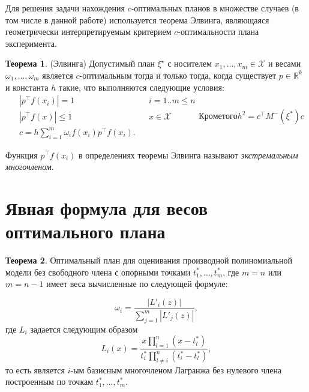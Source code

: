 \documentclass[specialist,
               substylefile = spbu.rtx,
               subf,href,colorlinks=true, 12pt]{disser}
\theoremstyle{definition}
\newtheorem{theorem}{Теорема}
\newcommand\abs[1]{\left\lvert#1\right\rvert}
\begin{document}
  Для решения задачи нахождения $c$-оптимальных планов в множестве случаев (в том числе в данной работе) используется теорема Элвинга, являющаяся геометрически интерпретируемым критерием $c$-оптимальности плана эксперимента.
  \begin{theorem}
  \label{th:elfving}
  (Элвинга) \cite{elfving1952}
  Допустимый план $\xi^\star$ с носителем $x_1, \ldots, x_m \in \mathcal{X}$ и весами $\omega_1, \ldots, \omega_m$ является $c$-оптимальным тогда и только тогда, когда существует $p \in \mathbb{R}^k$ и константа $h$ такие, что выполняются следующие условия:
  \begin{subequations}
  \label{eq:elfving}
  \begin{align}
	&\abs{p^\top f(x_i)} = 1 &&i=1..m \leqslant n \label{eq:elfving:eq1} \\
	&\abs{p^\top f(x)} \leqslant 1  &&x \in \mathcal{X} \label{eq:elfving:eq2} \\
	&c = h \sum_{i=1}^m \omega_i f(x_i) p^\top f(x_i) \label{eq:elfving:eq3}.
  \end{align}
  Кроме того
  \begin{equation*}
  	h^2 = c^\top M^{-}(\xi^{*})c
  \end{equation*}
  \end{subequations}
  \end{theorem}
	Функция $p^\top f(x_i)$ в определениях теоремы Элвинга называют \textit{экстремальным многочленом}.
	
	\section{Явная формула для весов оптимального плана}
	
	\begin{theorem}
	\label{th:weights}
	Оптимальный план для оценивания производной полиномиальной модели без свободного члена с опорными точками $t_1^*, \ldots, t_m^*$, где $m=n$ или $m=n-1$ имеет веса вычисленные по следующей формуле:	
	
	\begin{equation}
	\label{eq:weights}
		\omega_i = \frac{\abs{L'_i(z)}}{\sum_{j=1}^m \abs{L'_j(z)}},
	\end{equation}
	где $L_i$ задается следующим образом
	\begin{equation}
		\label{eq:lagr}
		L_{i}(x) = \frac{x \prod_{l=1}^n (x - t_l^*)}{t_i^* \prod_{l \neq i}^n (t_i^* - t_l^*)},
	\end{equation}	
	то есть является $i$-ым базисным многочленом Лагранжа без нулевого члена построенным по точкам $t_1^*, \ldots, t_m^*$.
	\end{theorem}
	
\end{document}
